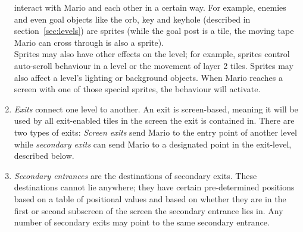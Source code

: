 \begin{enumerate}
  interact with Mario and each other in a certain way. For example,
  enemies and even goal objects like the orb, key and keyhole
  (described in section~\ref{sec:levels}) are sprites (while the goal
  post is a tile, the moving tape Mario can cross through is also a
  sprite). \\
  Sprites may also have other effects on the level; for example,
  sprites control auto-scroll behaviour in a level or the movement of
  layer 2 tiles. Sprites may also affect a level's lighting or
  background objects. When Mario reaches a screen with one of those
  special sprites, the behaviour will activate.
\item \emph{Exits} connect one level to another. An exit is
  screen-based, meaning it will be used by all exit-enabled tiles in
  the screen the exit is contained in. There are two types of exits:
  \emph{Screen exits} send Mario to the entry point of another level
  while \emph{secondary exits} can send Mario to a designated point in
  the exit-level, described below.
\item \emph{Secondary entrances} are the destinations of secondary
  exits. These destinations cannot lie anywhere; they have certain
  pre-determined positions based on a table of positional values and
  based on whether they are in the first or second subscreen of the
  screen the secondary entrance lies in. Any number of secondary exits
  may point to the same secondary entrance.
\end{enumerate}

